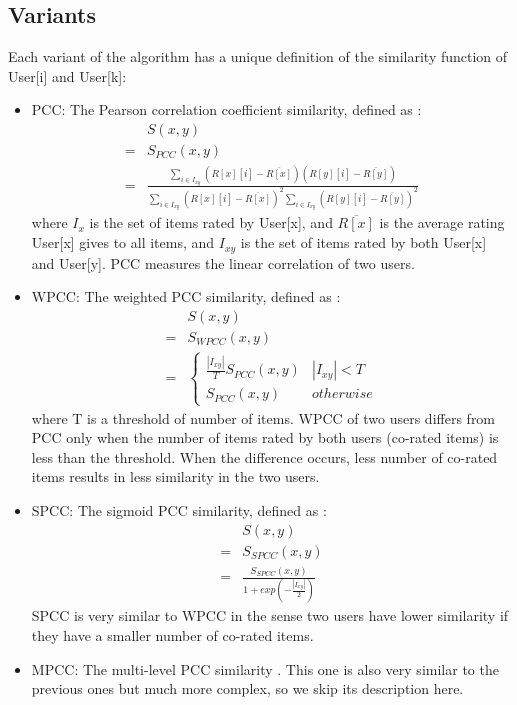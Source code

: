 \documentclass[letterpaper]{article}
\begin{document}
\subsection{Variants}
Each variant of the algorithm has a unique definition of the similarity 
function of User[i] and User[k]:
\begin{itemize}
	\item PCC: The Pearson correlation coefficient similarity, defined as 
	\citeauthor{resnick1994grouplens}:
	\begin{align*}
		& S(x, y) \\
		=& S_{PCC}(x, y) \\
		=& \frac{\sum_{i \in I_{xy}}(R[x][i] - \overline{R[x]})(R[y][i] - 
		\overline{R[y]})}{\sum_{i \in I_{xy}}(R[x][i] - \overline{R[x]})^2 
		\sum_{i 
		\in I_{xy}}(R[y][i] - \overline{R[y]})^2 }
	\end{align*}
	where $ I_{x} $ is the set of items rated by User[x],
	and	$ \overline{R[x]} $ is the average rating User[x] gives to all items,
	and $ I_{xy} $ is the set of items rated by both User[x] and User[y].
	PCC measures the linear correlation of two users.
	\item WPCC: The weighted PCC similarity, defined as 
	\citeauthor{herlocker1999algorithmic}:
	\begin{align*}
		& S(x, y) \\
		=& S_{WPCC}(x, y) \\
		=&
		\begin{cases}
			\frac{|I_{xy}|}{T} S_{PCC}(x, y) & |I_{xy}| < T \\
			S_{PCC}(x, y) & otherwise
		\end{cases}
	\end{align*}
	where T is a threshold of number of items. 
	WPCC of two users differs from PCC only when the number of items rated by 
	both users (co-rated items) is less than the threshold. 
	When the difference occurs, less number of co-rated items results in less 
	similarity in the two users.
	\item SPCC: The sigmoid PCC similarity, defined as 
	\citeauthor{jamali2009trustwalker}:
	\begin{align*}
		& S(x, y) \\
		=& S_{SPCC} (x, y) \\
		=& \frac{S_{SPCC}(x, y)}{1 + exp(-\frac{|I_{xy}|}{2})}
	\end{align*}
	SPCC is very similar to WPCC in the sense two users have lower similarity 
	if they have a smaller number of co-rated items.
	\item MPCC: The multi-level PCC similarity \citeauthor{polatidis2016multi}. 
	This one is also very similar to the previous ones but much more complex, 
	so we skip its description here.
\end{itemize}
\end{document}

